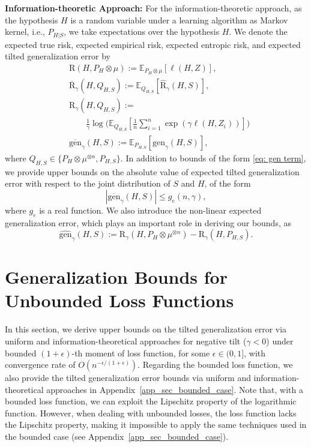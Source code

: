\documentclass{article}
\theoremstyle{plain}
\theoremstyle{plain}
\theoremstyle{definition}
\theoremstyle{remark}
\newcommand{\RTERM}{\widehat{\mathrm{R}}_{\gamma}}
\newcommand{\RTrue}{\mathrm{R}}
\newcommand{\RTT}{\overline{\mathrm{R}}_{\gamma}}
\newcommand{\RTET}{\mathrm{R}_{\gamma}}
\newcommand{\mbE}{\mathbb{E}}
\begin{document}
\textbf{Information-theoretic Approach:} For the information-theoretic approach, as the hypothesis $H$ is a random variable under a learning algorithm as Markov kernel, i.e., $P_{H|S}$, we take expectations over the hypothesis $H$. We denote the expected true risk, expected empirical risk, expected entropic risk, and expected tilted generalization error by 
\begin{equation}\label{eq: expected risks}
    \begin{split}
     &\RTrue(H, P_{H}\otimes \mu):=\mbE_{P_{H}\otimes \mu}[\ell(H,Z)],\\
&\RTT(H,Q_{H,S}) :=\mbE_{Q_{H,S}}[\RTERM(H,S)],\\
&\RTET(H,Q_{H,S}):= \\&\qquad\frac{1}{\gamma}\log\Big(\mbE_{Q_{H,S}}[\frac{1}{n}\sum_{i=1}^n \exp(\gamma \ell(H,Z_i))]\Big)\\
&\overline{\mathrm{gen}}_{\gamma}(H,S):=\mbE_{P_{H,S}}[\mathrm{gen}_{\gamma}(H,S)],
\end{split}
\end{equation}
where $Q_{H,S}\in\{P_H\otimes \mu^{\otimes n}, P_{H,S} \}$. In addition to bounds of the form \eqref{eq: gen term}, we provide upper bounds on the absolute value of expected tilted generalization error with respect to the joint distribution of $S$ and $H$, of the form
\begin{equation}\label{eq: non-linear gen}\nonumber 
    |\overline{\mathrm{gen}}_{\gamma}(H,S)|\leq g_e(n,\gamma),
\end{equation}
where $g_e$ is a real function. We also introduce the non-linear expected generalization error, which plays an important role in deriving our bounds, as
\begin{equation}
     \widehat{\mathrm{gen}}_{\gamma}(H,S):=  \RTET(H,P_{H}\otimes \mu^{\otimes n})-\RTET(H,P_{H,S}).
\end{equation}
\section{Generalization Bounds for Unbounded Loss Functions}\label{sec: ubounded loss gen}
In this section, we derive upper bounds on the tilted generalization error via uniform and information-theoretical approaches for negative tilt ($\gamma<0$) under bounded $(1+\epsilon)$-th moment of loss function, for some $\epsilon\in(0,1]$, with convergence rate of $O(n^{-\epsilon/(1+\epsilon)})$. Regarding the bounded loss function, we also provide the tilted generalization error bounds via uniform and information-theoretical approaches in Appendix~\ref{app_sec_bounded_case}. Note that, with a bounded loss function, we can exploit
the Lipschitz property of the logarithmic function. However, when dealing with unbounded losses, the loss function lacks the Lipschitz property, making it impossible to apply the same techniques used in the bounded case (see Appendix~\ref{app_sec_bounded_case}).
\end{document}
